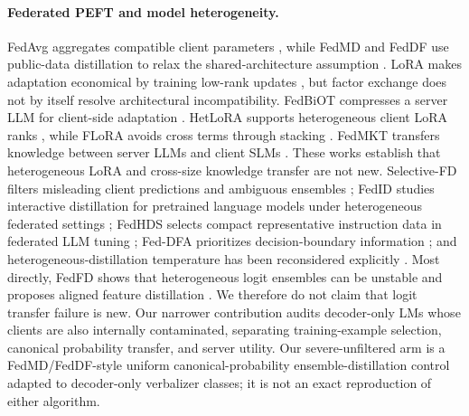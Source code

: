 \documentclass[letterpaper]{article}
\begin{document}
\paragraph{Federated PEFT and model heterogeneity.}
FedAvg aggregates compatible client parameters \cite{mcmahan2017fedavg}, while
FedMD and FedDF use public-data distillation to relax the shared-architecture
assumption \cite{li2019fedmd,lin2020feddf}.  LoRA makes adaptation economical
by training low-rank updates \cite{hu2022lora}, but factor exchange does not by
itself resolve architectural incompatibility.
FedBiOT compresses a server LLM for client-side adaptation
\cite{wu2024fedbiot}.  HetLoRA supports heterogeneous client LoRA ranks
\cite{cho2024hetlora}, while FLoRA avoids cross terms through stacking
\cite{wang2024flora}.  FedMKT transfers knowledge between server LLMs and
client SLMs \cite{fan2025fedmkt}.  These works establish that heterogeneous
LoRA and cross-size knowledge transfer are not new.  Selective-FD filters
misleading client predictions and ambiguous ensembles
\cite{shao2024selectivefd}; FedID studies interactive distillation for
pretrained language models under heterogeneous federated settings
\cite{ma2023fedid}; FedHDS selects compact representative instruction data in
federated LLM tuning \cite{qin2025fedhds}; Fed-DFA prioritizes
decision-boundary information \cite{wang2025feddfa}; and
heterogeneous-distillation temperature has been reconsidered explicitly
\cite{qi2025rethinking}.  Most directly, FedFD shows
that heterogeneous logit ensembles can be unstable and proposes aligned
feature distillation \cite{li2025fedfd}.  We therefore do not claim that logit
transfer failure is new.  Our narrower contribution audits decoder-only LMs
whose clients are also internally contaminated, separating training-example
selection, canonical probability transfer, and server utility.
Our severe-unfiltered arm is a FedMD/FedDF-style uniform canonical-probability
ensemble-distillation control adapted to decoder-only verbalizer classes; it
is not an exact reproduction of either algorithm.
\end{document}
